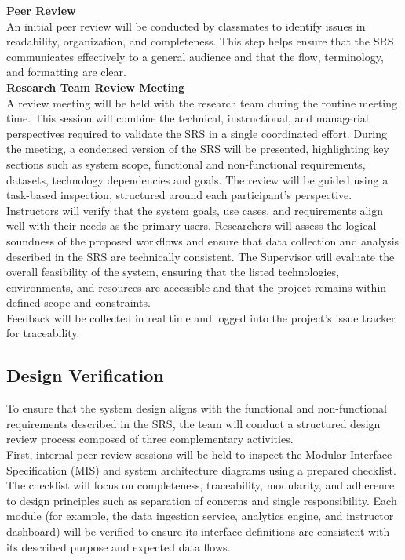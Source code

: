 \documentclass[12pt, titlepage]{article}
\begin{document}
\textbf{Peer Review}\\

An initial peer review will be conducted by classmates to identify issues in readability, organization, and completeness. This step helps ensure that the SRS communicates effectively to a general audience and that the flow, terminology, and formatting are clear.\\

\textbf{Research Team Review Meeting}\\

A review meeting will be held with the research team during the routine meeting time. This session will combine the technical, instructional, and managerial perspectives required to validate the SRS in a single coordinated effort. During the meeting, a condensed version of the SRS will be presented, highlighting key sections such as system scope, functional and non-functional requirements, datasets, technology dependencies and goals. The review will be guided using a task-based inspection, structured around each participant’s perspective.\\

Instructors will verify that the system goals, use cases, and requirements align well with their needs as the primary users. Researchers will assess the logical soundness of the proposed workflows and ensure that data collection and analysis described in the SRS are technically consistent. The Supervisor will evaluate the overall feasibility of the system, ensuring that the listed technologies, environments, and resources are accessible and that the project remains within defined scope and constraints.\\

Feedback will be collected in real time and logged into the project’s issue tracker for traceability.\\

\subsection{Design Verification}

To ensure that the system design aligns with the functional and non-functional requirements described in the SRS, the team will conduct a structured design review process composed of three complementary activities. \\

First, internal peer review sessions will be held to inspect the Modular Interface Specification (MIS) and system architecture diagrams using a prepared checklist. The checklist will focus on completeness, traceability, modularity, and adherence to design principles such as separation of concerns and single responsibility. Each module (for example, the data ingestion service, analytics engine, and instructor dashboard) will be verified to ensure its interface definitions are consistent with its described purpose and expected data flows. \\
\end{document}
